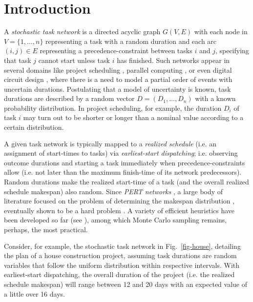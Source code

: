\section{Introduction}

A \emph{stochastic task network} is a directed acyclic graph $G(V, E)$ 
with each node in $V = \{1,\ldots,n\}$ representing a task with a random duration and 
each arc $(i,j)\in E$ representing a precedence-constraint between tasks $i$ and $j$,
specifying that task $j$ cannot start unless task $i$ has finished.
%
Such networks appear in several domains like project scheduling \cite{leus2011resource}, 
parallel computing \cite{shestak2008}, or even digital circuit design \cite{blaauw2008},
where there is a need to model a partial order of events with uncertain durations.
%
Postulating that a model of uncertainty is known, 
task durations are described by a random vector $D=(D_1,\ldots,D_n)$ with a known probability distribution.
%
In project scheduling, for example, the duration $D_i$ of task $i$ may turn out to be shorter or longer 
than a nominal value according to a certain distribution.

A given task network is typically mapped to a \emph{realized schedule} (i.e. an assignment of start-times to tasks) via \emph{earliest-start dispatching};
i.e. observing outcome durations and starting a task immediately when precedence-constraints allow 
(i.e. not later than the maximum finish-time of its network predecessors).
Random durations make the realized start-time of a task (and the overall realized schedule makespan) also random.
Since \emph{PERT networks} \cite{malcolm1959}, 
a large body of literature focused on the problem of determining the makespan distribution \cite{adlakha1989},
eventually shown to be a hard problem \cite{hagstrom1990}. 
A variety of efficient heuristics have been developed so far (see \cite{blaauw2008}), 
among which Monte Carlo sampling remains, perhaps, the most practical.

Consider, for example, the stochastic task network in Fig.~\ref{fig-house}, 
detailing the plan of a house construction project,
assuming task durations are random variables that follow the uniform distribution within respective intervals.
With earliest-start dispatching, the overall duration of the project (i.e. the realized schedule makespan) 
will range between 12 and 20 days with an expected value of a little over 16 days.

